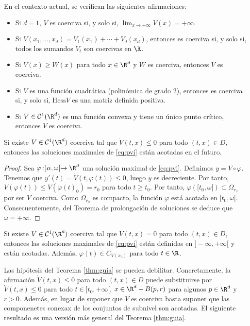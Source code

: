 \documentclass{article}
\begin{document}
\begin{prop}
  En el contexto actual, se verifican las siguientes afirmaciones:
  \begin{itemize}
  \item Si $d = 1$, $V$ es coerciva si, y solo si, $\lim_{x \to \pm \infty}V(x) = +\infty$.
  \item Si $V(x_1, \ldots, x_d) = V_1(x_1)+ \cdots + V_d(x_d)$, entonces es coerciva si, y solo si,
    todos los sumandos $V_i$ son coercivas en $\R$.
  \item Si $V(x) \ge W(x)$ para todo $x \in \R^d$ y $W$ es coerciva, entonces $V$ es coerciva.
  \item Si $V$ es una función cuadrática (polinómica de grado $2$), entonces es coerciva si, y solo
    si, $\mathrm{Hess} V$ es una matriz definida positiva.
  \item Si $V \in \mathcal{C}^1(\R^d)$ es una función convexa y tiene un único punto crítico,
    entonces $V$ es coerciva.
  \end{itemize}
\end{prop}

\begin{theorem}
  \label{thm:guia}
  Si existe $V\in \mathcal{C}^1(\R^d)$ coerciva tal que $\dot{V}(t,x) \le 0$ para todo
  $(t,x) \in D$, entonces las soluciones maximales de \eqref{eq:pvi} están acotadas en el futuro.
\end{theorem}
\begin{proof}
  Sea $\varphi: ]\alpha, \omega[ \to \R^d$ una solución maximal de \eqref{eq:pvi}. Definimos
  $y = V \circ \varphi$. Tenemos que $y'(t) = \dot{V}(t, \varphi(t)) \le 0$, luego $y$ es
  decreciente. Por tanto, $V(\varphi(t)) \le V(\varphi(t)_0) = r_0$ para todo $t \ge t_0$. Por
  tanto, $\varphi([t_0, \omega[) \subset \Omega_{r_0}$ por ser $V$ coerciva. Como $\Omega_{r_0}$ es
  compacto, la función $\varphi$ está acotada en $[t_0, \omega[$. Consecuentemente, del Teorema de
  prolongación de soluciones se deduce que $\omega = +\infty$.
\end{proof}

\begin{corollary}
  Si existe $V\in \mathcal{C}^1(\R^d)$ coerciva tal que $\dot{V}(t,x) = 0$ para todo $(t,x) \in D$,
  entonces las soluciones maximales de \eqref{eq:pvi} están definidas en $]-\infty, +\infty[$ y
  están acotadas. Además, $\varphi(t) \in C_{V(x_0)}$ para todo $t \in \R$.
\end{corollary}

\begin{remark}
  Las hipótesis del Teorema \ref{thm:guia} se pueden debilitar. Concretamente, la afirmación
  $\dot{V}(t,x) \le 0$ para todo $(t,x) \in D$ puede substituirse por $\dot{V}(t,x) \le 0$ para todo
  $t \in ]t_0, +\infty[$, $x \in \R^d - B(p, r)$ para algunos $p \in \R^d$ y $ r > 0$. Además, en
  lugar de suponer que $V$ es coerciva basta suponer que las componenetes conexax de los conjuntos
  de subnivel son acotadas. El siguiente resultado es una versión más general del Teorema
  \ref{thm:guia}.
\end{remark}
\end{document}
